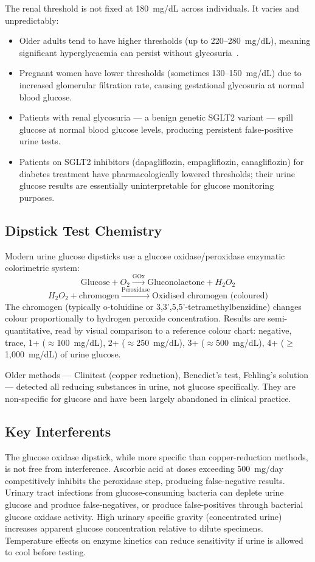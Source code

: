The renal threshold is not fixed at 180~mg/dL across individuals. It varies  and unpredictably:
\begin{itemize}
  \item Older adults tend to have higher thresholds (up to 220--280~mg/dL), meaning significant hyperglycaemia can persist without glycosuria~\cite{ncbi_glucosuria}.
  \item Pregnant women have lower thresholds (sometimes 130--150~mg/dL) due to increased glomerular filtration rate, causing gestational glycosuria at normal blood glucose.
  \item Patients with renal glycosuria --- a benign genetic SGLT2 variant --- spill glucose at normal blood glucose levels, producing persistent false-positive urine tests.
  \item Patients on SGLT2 inhibitors (dapagliflozin, empagliflozin, canagliflozin) for diabetes treatment have pharmacologically lowered thresholds; their urine glucose results are essentially uninterpretable for glucose monitoring purposes.
\end{itemize}

\subsection*{Dipstick Test Chemistry}

Modern urine glucose dipsticks use a glucose oxidase/peroxidase enzymatic colorimetric system:
\[
  \text{Glucose} + O_2 \xrightarrow{\text{GOx}} \text{Gluconolactone} + H_2O_2
\]
\[
  H_2O_2 + \text{chromogen} \xrightarrow{\text{Peroxidase}} \text{Oxidised chromogen (coloured)}
\]
The chromogen (typically o-toluidine or 3,3',5,5'-tetramethylbenzidine) changes colour proportionally to hydrogen peroxide concentration. Results are semi-quantitative, read by visual comparison to a reference colour chart: negative, trace, 1+ ($\approx$100~mg/dL), 2+ ($\approx$250~mg/dL), 3+ ($\approx$500~mg/dL), 4+ ($\geq$1,000~mg/dL) of urine glucose.

Older methods --- Clinitest (copper reduction), Benedict's test, Fehling's solution --- detected all reducing substances in urine, not glucose specifically. They are non-specific for glucose and have been largely abandoned in clinical practice.

\subsection*{Key Interferents}

The glucose oxidase dipstick, while more specific than copper-reduction methods, is not free from interference. Ascorbic acid at doses exceeding 500~mg/day competitively inhibits the peroxidase step, producing false-negative results. Urinary tract infections from glucose-consuming bacteria can deplete urine glucose and produce false-negatives, or produce false-positives through bacterial glucose oxidase activity. High urinary specific gravity (concentrated urine) increases apparent glucose concentration relative to dilute specimens. Temperature effects on enzyme kinetics can reduce sensitivity if urine is allowed to cool before testing.


